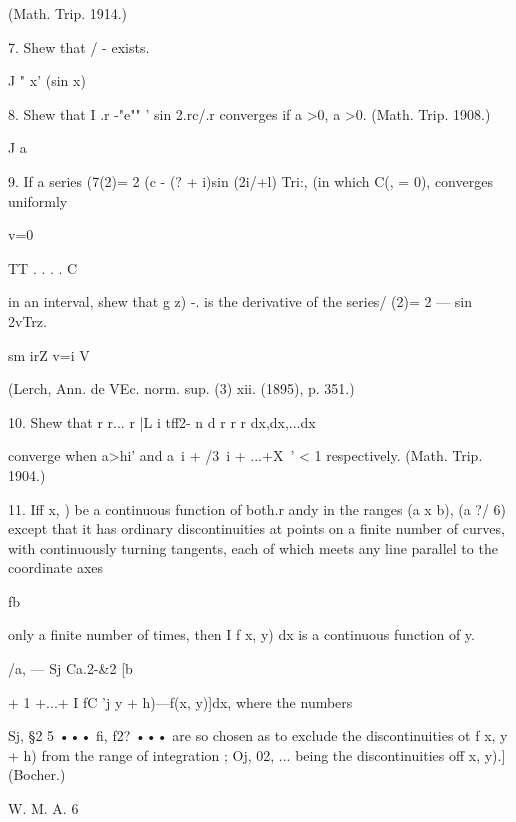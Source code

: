 (Math. Trip. 1914.)

7. Shew that / - exists.

J " x' (sin x)

8. Shew that I .r -"e"" ' sin 2.rc/.r converges if a >0, a >0. (Math.
Trip. 1908.)

J a

9. If a series (7(2)= 2 (c - (? + i)sin (2i/+l) Tri:, (in which C(, =
0), converges uniformly

v=0

TT . . . . C

in an interval, shew that g z) -. is the derivative of the series/
(2)= 2 — sin 2vTrz.

sm irZ v=i V

(Lerch, Ann. de VEc. norm. sup. (3) xii. (1895), p. 351.)

10. Shew that r r... r |L i tff2- n d r r r dx,dx,...dx

converge when a>hi' and a~i + /3~i + ...+X~' < 1 respectively. (Math.
Trip. 1904.)

11. Iff x, ) be a continuous function of both.r andy in the ranges (a
x b), (a ?/ 6) except that it has ordinary discontinuities at points
on a finite number of curves, with continuously turning tangents, each
of which meets any line parallel to the coordinate axes

fb

only a finite number of times, then I f x, y) dx is a continuous
function of y.

/a, — Sj Ca.2-\&2 [b

+ 1 +...+ I fC 'j y + h)—f(x, y)]dx, where the numbers

Sj, §2 5 ••• fi, f2? ••• are so chosen as to exclude the
discontinuities ot f x, y + h) from the range of integration ; Oj, 02,
... being the discontinuities off x, y).] (Bocher.)

W. M. A. 6

